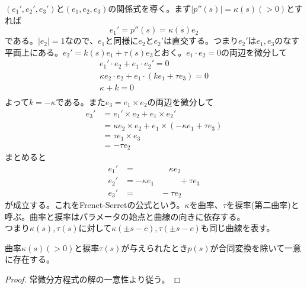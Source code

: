     $(e_1',e_2',e_3')$と$(e_1,e_2,e_3)$の関係式を導く。まず$|p''(s)| = \kappa(s)(> 0)$とすれば
        \[e_1' = p''(s) = \kappa(s)e_2\]
    である。$|e_2| = 1$なので、$e_1$と同様に$e_2$と$e_2'$は直交する。つまり$e_2'$は$e_1, e_3$のなす平面上にある。$e_2' = k(s)e_1 + \tau(s)e_3$とおく。$e_1 \cdot e_2 = 0$の両辺を微分して
    \begin{align*}
        e_1' \cdot e_2 + e_1 \cdot e_2' = 0\\
        \kappa e_2\cdot e_2 + e_1\cdot (ke_1 + \tau e_3) = 0\\
        \kappa + k = 0\\
    \end{align*}
    よって$k = -\kappa$である。また$e_3 = e_1\times e_2$の両辺を微分して
    \begin{align*}
        e_3'
        &= e_1' \times e_2 + e_1 \times e_2'\\
        &= \kappa e_2 \times e_2 + e_1 \times (-\kappa e_1 + \tau e_3)\\
        &= \tau e_1 \times e_3\\
        &= -\tau e_2
    \end{align*}
    まとめると
    \begin{align*}
        e_1' &= \qquad\qquad \kappa e_2\\
        e_2' &= -\kappa e_1\quad\qquad +\tau e_3\\
        e_3' &= \quad\qquad -\tau e_2
    \end{align*}
    が成立する。これをFrenet-Serretの公式という。$\kappa$を曲率、$\tau$を捩率(第二曲率)と呼ぶ。曲率と捩率はパラメータの始点と曲線の向きに依存する。$つまり\kappa(s),\tau(s)$に対して$\kappa(\pm s - c),\tau(\pm s - c)$も同じ曲線を表す。
    \begin{thm}[空間曲線の基本定理]
        曲率$\kappa(s)(> 0)$と捩率$\tau(s)$が与えられたとき$p(s)$が合同変換を除いて一意に存在する。
    \end{thm}
    \begin{proof}
        常微分方程式の解の一意性より従う。
    \end{proof}
